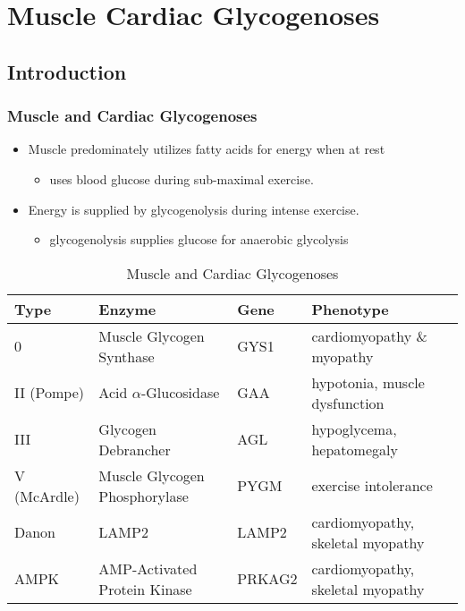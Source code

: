 \documentclass{scrartcl}
\begin{document}
\section{Muscle Cardiac Glycogenoses}
\label{sec:org440fade}
\subsection{Introduction}
\label{sec:orgcac4016}
\subsubsection{Muscle and Cardiac Glycogenoses}
\label{sec:org32f30e9}

\begin{itemize}
\item Muscle predominately utilizes fatty acids for energy when at rest
\begin{itemize}
\item uses blood glucose during sub-maximal exercise.
\end{itemize}
\item Energy is supplied by glycogenolysis during intense exercise.
\begin{itemize}
\item glycogenolysis supplies glucose for anaerobic glycolysis
\end{itemize}
\end{itemize}

\begin{table}[htbp]
\caption{\label{tab:org5dfd91a}
Muscle and Cardiac Glycogenoses}
\centering
\begin{tabular}{llll}
Type & Enzyme & Gene & Phenotype\\
\hline
0 & Muscle Glycogen Synthase & GYS1 & cardiomyopathy \& myopathy\\
II (Pompe) & Acid \(\alpha\)-Glucosidase & GAA & hypotonia, muscle dysfunction\\
III & Glycogen Debrancher & AGL & hypoglycema, hepatomegaly\\
V (McArdle) & Muscle Glycogen Phosphorylase & PYGM & exercise intolerance\\
Danon & LAMP2 & LAMP2 & cardiomyopathy, \textpm{} skeletal myopathy\\
AMPK & AMP-Activated Protein Kinase & PRKAG2 & cardiomyopathy, \textpm{} skeletal myopathy\\
\end{tabular}
\end{table}
\end{document}
